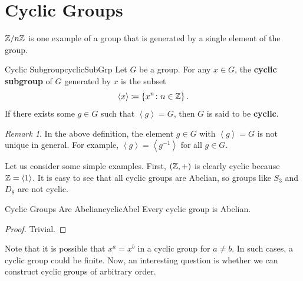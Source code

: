 \documentclass[math]{amznotes}
\theoremstyle{remark}
\newtheorem*{remark}{Remark}
\newcommand{\0}{\mathbf{0}}
\newcommand{\1}{\mathbf{1}}
\begin{document}
\section{Cyclic Groups}
$\mathbb{Z} \slash n\mathbb{Z}$ is one example of a group that is generated by a single element of the group. 
\begin{dfnbox}{Cyclic Subgroup}{cyclicSubGrp}
    Let $G$ be a group. For any $x \in G$, the {\color{red} \textbf{cyclic subgroup}} of $G$ generated by $x$ is the subset 
    \begin{equation*}
        \left\langle x \right\rangle \coloneqq \left\{x^n \colon n \in \mathbb{Z}\right\}.
    \end{equation*}
    If there exists some $g \in G$ such that $\left\langle g \right\rangle = G$, then $G$ is said to be {\color{red} \textbf{cyclic}}.
\end{dfnbox}
\begin{notebox}
    \begin{remark}
        In the above definition, the element $g \in G$ with $\left\langle g \right\rangle = G$ is not unique in general. For example, $\left\langle g \right\rangle = \left\langle g^{-1} \right\rangle$ for all $g \in G$.
    \end{remark}
\end{notebox}
Let us consider some simple examples. First, $\left(\mathbb{Z}, +\right)$ is clearly cyclic because $\mathbb{Z} = \left\langle 1 \right\rangle$. It is easy to see that all cyclic groups are Abelian, so groups like $S_3$ and $D_8$ are not cyclic.
\begin{probox}{Cyclic Groups Are Abelian}{cyclicAbel}
    Every cyclic group is Abelian.
    \tcblower
    \begin{proof}
        Trivial.
    \end{proof}
\end{probox}
Note that it is possible that $x^a = x^b$ in a cyclic group for $a \neq b$. In such cases, a cyclic group could be finite. Now, an interesting question is whether we can construct cyclic groups of arbitrary order.
\end{document}

